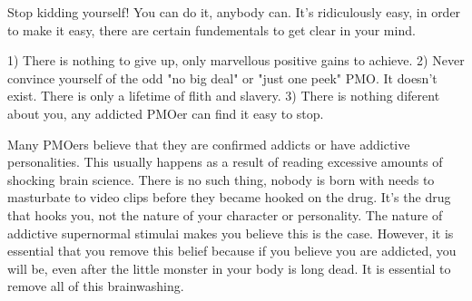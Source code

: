 Stop kidding yourself! You can do it, anybody can. It's ridiculously easy, in order to make it easy, there are certain fundementals to get clear in your mind.

  1) There is nothing to give up, only marvellous positive gains to achieve.
  2) Never convince yourself of the odd "no big deal" or "just one peek" PMO. It doesn't exist. There is only a lifetime of flith and slavery.
  3) There is nothing diferent about you, any addicted PMOer can find it easy to stop.

Many PMOers believe that they are confirmed addicts or have addictive personalities. This usually happens as a result of reading excessive amounts of shocking brain science. There is no such thing, nobody is born with needs to masturbate to video clips before they became hooked on the drug. It's the drug that hooks you, not the nature of your character or personality. The nature of addictive supernormal stimulai makes you believe this is the case. However, it is essential that you remove this belief because if you believe you are addicted, you will be, even after the little monster in your body is long dead. It is essential to remove all of this brainwashing.

